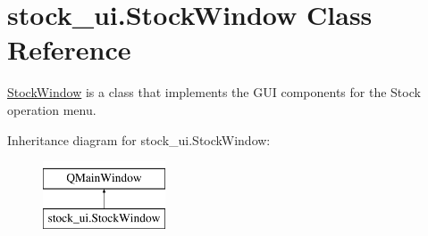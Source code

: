 \hypertarget{classstock__ui_1_1_stock_window}{}\section{stock\+\_\+ui.\+Stock\+Window Class Reference}
\label{classstock__ui_1_1_stock_window}


\hyperlink{classstock__ui_1_1_stock_window}{Stock\+Window} is a class that implements the G\+UI components for the Stock operation menu.  


Inheritance diagram for stock\+\_\+ui.\+Stock\+Window\+:\begin{figure}[H]
\begin{center}
\leavevmode
\includegraphics[height=2.000000cm]{classstock__ui_1_1_stock_window}
\end{center}
\end{figure}
